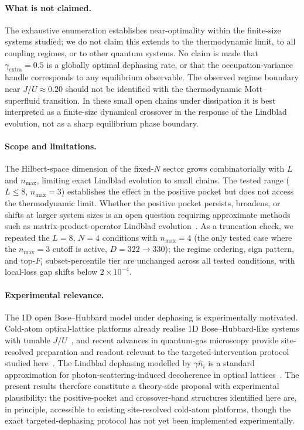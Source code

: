 \documentclass[aps,prresearch,reprint,amsmath,amssymb,longbibliography,floatfix]{revtex4-2}
\newcommand{\Fi}{F_i}
\begin{document}
\paragraph*{What is not claimed.}
The exhaustive enumeration establishes near-optimality within the
finite-size systems studied; we do not claim this extends to the
thermodynamic limit, to all coupling regimes, or to other quantum systems.
No claim is made that $\gamma_{\mathrm{extra}}=0.5$ is a globally
optimal dephasing rate, or that the occupation-variance handle corresponds
to any equilibrium observable.
The observed regime boundary near $J/U\approx0.20$ should not be
identified with the thermodynamic Mott--superfluid transition.
In these small open chains under dissipation it is best interpreted as a
finite-size dynamical crossover in the response of the Lindblad evolution,
not as a sharp equilibrium phase boundary.

\paragraph*{Scope and limitations.}
The Hilbert-space dimension of the fixed-$N$ sector grows combinatorially
with $L$ and $n_{\max}$, limiting exact Lindblad evolution to small chains.
The tested range ($L\leq8$, $n_{\max}=3$) establishes the effect in the
positive pocket but does not access the thermodynamic limit.
Whether the positive pocket persists, broadens, or shifts at larger system
sizes is an open question requiring approximate methods such as
matrix-product-operator Lindblad evolution~\cite{daley2014}.
As a truncation check, we repeated the $L=8$, $N=4$ conditions with
$n_{\max}=4$ (the only tested case where the $n_{\max}=3$ cutoff is active,
$D=322\to330$); the regime ordering, sign pattern, and top-$\Fi$
subset-percentile tier are unchanged across all tested conditions, with
local-loss gap shifts below $2\times10^{-4}$.

\paragraph*{Experimental relevance.}
The 1D open Bose--Hubbard model under dephasing is experimentally
motivated.
Cold-atom optical-lattice platforms already realise 1D Bose--Hubbard-like
systems with tunable $J/U$~\cite{jaksch1998,greiner2002}, and recent
advances in quantum-gas microscopy provide site-resolved preparation and
readout relevant to the targeted-intervention protocol studied
here~\cite{gross2021}.
The Lindblad dephasing modelled by $\gamma\hat{n}_i$ is a standard
approximation for photon-scattering-induced decoherence in optical
lattices~\cite{pichler2010,daley2014}.
The present results therefore constitute a theory-side proposal with
experimental plausibility: the positive-pocket and crossover-band
structures identified here are, in principle, accessible to existing
site-resolved cold-atom platforms, though the exact targeted-dephasing protocol has not yet been implemented
experimentally.
\end{document}
